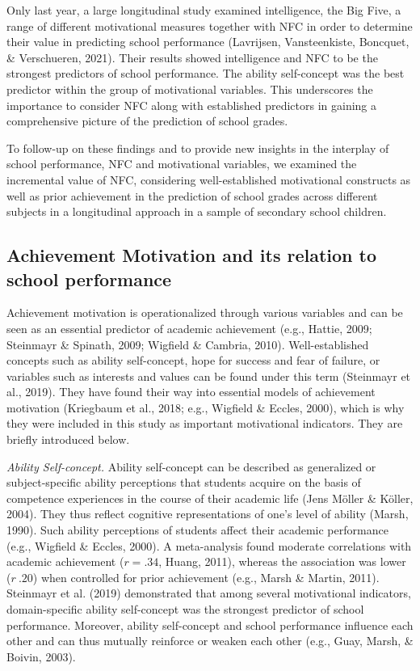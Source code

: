 \documentclass[
  man]{apa6}
\begin{document}
Only last year, a large longitudinal study examined intelligence, the Big Five, a range of different motivational measures together with NFC in order to determine their value in predicting school performance (Lavrijsen, Vansteenkiste, Boncquet, \& Verschueren, 2021). Their results showed intelligence and NFC to be the strongest predictors of school performance. The ability self-concept was the best predictor within the group of motivational variables. This underscores the importance to consider NFC along with established predictors in gaining a comprehensive picture of the prediction of school grades.

To follow-up on these findings and to provide new insights in the interplay of school performance, NFC and motivational variables, we examined the incremental value of NFC, considering well-established motivational constructs as well as prior achievement in the prediction of school grades across different subjects in a longitudinal approach in a sample of secondary school children.

\hypertarget{achievement-motivation-and-its-relation-to-school-performance}{%
\subsection{Achievement Motivation and its relation to school performance}\label{achievement-motivation-and-its-relation-to-school-performance}}

Achievement motivation is operationalized through various variables and can be seen as an essential predictor of academic achievement (e.g., Hattie, 2009; Steinmayr \& Spinath, 2009; Wigfield \& Cambria, 2010). Well-established concepts such as ability self-concept, hope for success and fear of failure, or variables such as interests and values can be found under this term (Steinmayr et al., 2019). They have found their way into essential models of achievement motivation (Kriegbaum et al., 2018; e.g., Wigfield \& Eccles, 2000), which is why they were included in this study as important motivational indicators. They are briefly introduced below.

\emph{Ability Self-concept.} Ability self-concept can be described as generalized or subject-specific ability perceptions that students acquire on the basis of competence experiences in the course of their academic life (Jens Möller \& Köller, 2004). They thus reflect cognitive representations of one's level of ability (Marsh, 1990). Such ability perceptions of students affect their academic performance (e.g., Wigfield \& Eccles, 2000). A meta-analysis found moderate correlations with academic achievement (\(r=.34\), Huang, 2011), whereas the association was lower (\(r~.20\)) when controlled for prior achievement (e.g., Marsh \& Martin, 2011). Steinmayr et al. (2019) demonstrated that among several motivational indicators, domain-specific ability self-concept was the strongest predictor of school performance. Moreover, ability self-concept and school performance influence each other and can thus mutually reinforce or weaken each other (e.g., Guay, Marsh, \& Boivin, 2003).
\end{document}
